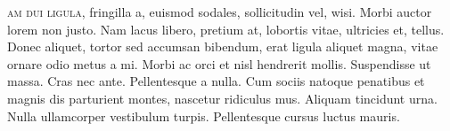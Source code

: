 \documentclass{article}
\renewcommand{\,}{\kern0.2ex}
\begin{document}
\lettrine[lraise=0.15,nindent=0.1em]{}{am dui ligula}, fringilla a, euismod sodales, sollicitudin vel, wisi. Morbi auctor lorem
non justo. Nam lacus libero, pretium at, lobortis vitae, ultricies et, tellus. Donec aliquet,
tortor sed accumsan bibendum, erat ligula aliquet magna, vitae ornare odio metus a mi.
Morbi ac orci et nisl hendrerit mollis. Suspendisse ut massa. Cras nec ante. Pellentesque a
nulla. Cum sociis natoque penatibus et magnis dis parturient montes, nascetur ridiculus
mus. Aliquam tincidunt urna. Nulla ullamcorper vestibulum turpis. Pellentesque cursus
luctus mauris.
\end{document}
